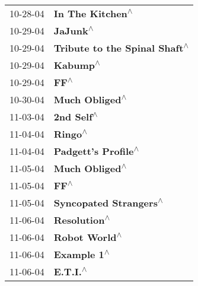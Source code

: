 \begin{supertabular}{p{0.25\columnwidth}p{0.75\columnwidth}}
 10-28-04 &                                                           \textbf{In The Kitchen\textsuperscript{$\wedge$}} \\
 10-29-04 &                                                                   \textbf{JaJunk\textsuperscript{$\wedge$}} \\
 10-29-04 &                                              \textbf{Tribute to the Spinal Shaft\textsuperscript{$\wedge$}} \\
 10-29-04 &                                                                   \textbf{Kabump\textsuperscript{$\wedge$}} \\
 10-29-04 &                                                                       \textbf{FF\textsuperscript{$\wedge$}} \\
 10-30-04 &                                                             \textbf{Much Obliged\textsuperscript{$\wedge$}} \\
 11-03-04 &                                                                 \textbf{2nd Self\textsuperscript{$\wedge$}} \\
 11-04-04 &                                                                    \textbf{Ringo\textsuperscript{$\wedge$}} \\
 11-04-04 &                                                        \textbf{Padgett's Profile\textsuperscript{$\wedge$}} \\
 11-05-04 &                                                             \textbf{Much Obliged\textsuperscript{$\wedge$}} \\
 11-05-04 &                                                                       \textbf{FF\textsuperscript{$\wedge$}} \\
 11-05-04 &                                                     \textbf{Syncopated Strangers\textsuperscript{$\wedge$}} \\
 11-06-04 &                                                               \textbf{Resolution\textsuperscript{$\wedge$}} \\
 11-06-04 &                                                              \textbf{Robot World\textsuperscript{$\wedge$}} \\
 11-06-04 &                                                                \textbf{Example 1\textsuperscript{$\wedge$}} \\
 11-06-04 &                                                                   \textbf{E.T.I.\textsuperscript{$\wedge$}} \\

\end{supertabular}
